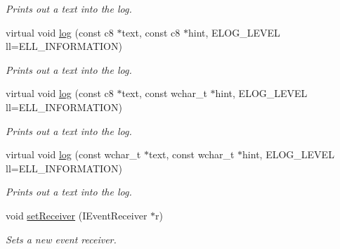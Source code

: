 \begin{DoxyCompactItemize}
\begin{DoxyCompactList}\small\item\em Prints out a text into the log. \end{DoxyCompactList}\item 
\hypertarget{classirr_1_1_c_logger_a6ff26c3a73a48aedff3a9db2f44e87dd}{virtual void \hyperlink{classirr_1_1_c_logger_a6ff26c3a73a48aedff3a9db2f44e87dd}{log} (const c8 $\ast$text, const c8 $\ast$hint, E\-L\-O\-G\-\_\-\-L\-E\-V\-E\-L ll=E\-L\-L\-\_\-\-I\-N\-F\-O\-R\-M\-A\-T\-I\-O\-N)}\label{classirr_1_1_c_logger_a6ff26c3a73a48aedff3a9db2f44e87dd}

\begin{DoxyCompactList}\small\item\em Prints out a text into the log. \end{DoxyCompactList}\item 
\hypertarget{classirr_1_1_c_logger_ac8b2a5811147e56535b391551105b8fa}{virtual void \hyperlink{classirr_1_1_c_logger_ac8b2a5811147e56535b391551105b8fa}{log} (const c8 $\ast$text, const wchar\-\_\-t $\ast$hint, E\-L\-O\-G\-\_\-\-L\-E\-V\-E\-L ll=E\-L\-L\-\_\-\-I\-N\-F\-O\-R\-M\-A\-T\-I\-O\-N)}\label{classirr_1_1_c_logger_ac8b2a5811147e56535b391551105b8fa}

\begin{DoxyCompactList}\small\item\em Prints out a text into the log. \end{DoxyCompactList}\item 
\hypertarget{classirr_1_1_c_logger_a48cae21ca5f5e9ec899942164c2f6f81}{virtual void \hyperlink{classirr_1_1_c_logger_a48cae21ca5f5e9ec899942164c2f6f81}{log} (const wchar\-\_\-t $\ast$text, const wchar\-\_\-t $\ast$hint, E\-L\-O\-G\-\_\-\-L\-E\-V\-E\-L ll=E\-L\-L\-\_\-\-I\-N\-F\-O\-R\-M\-A\-T\-I\-O\-N)}\label{classirr_1_1_c_logger_a48cae21ca5f5e9ec899942164c2f6f81}

\begin{DoxyCompactList}\small\item\em Prints out a text into the log. \end{DoxyCompactList}\item 
\hypertarget{classirr_1_1_c_logger_af6416db7dde8e6e4129d621491d7c9d4}{void \hyperlink{classirr_1_1_c_logger_af6416db7dde8e6e4129d621491d7c9d4}{set\-Receiver} (I\-Event\-Receiver $\ast$r)}\label{classirr_1_1_c_logger_af6416db7dde8e6e4129d621491d7c9d4}

\begin{DoxyCompactList}\small\item\em Sets a new event receiver. \end{DoxyCompactList}\end{DoxyCompactItemize}


